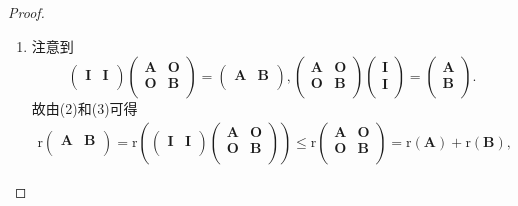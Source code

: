 \documentclass[../../main.tex]{subfiles}%
\begin{document}
\begin{proof}
\begin{enumerate}[(1)]
\item  注意到
\[
\left( \begin{matrix}
\boldsymbol{I}&		\boldsymbol{I}\\
\end{matrix} \right) \left( \begin{matrix}
\boldsymbol{A}&		\boldsymbol{O}\\
\boldsymbol{O}&		\boldsymbol{B}\\
\end{matrix} \right) =\left( \begin{matrix}
\boldsymbol{A}&		\boldsymbol{B}\\
\end{matrix} \right) ,\left( \begin{matrix}
\boldsymbol{A}&		\boldsymbol{O}\\
\boldsymbol{O}&		\boldsymbol{B}\\
\end{matrix} \right) \left( \begin{array}{c}
\boldsymbol{I}\\
\boldsymbol{I}\\
\end{array} \right) =\left( \begin{array}{c}
\boldsymbol{A}\\
\boldsymbol{B}\\
\end{array} \right) .
\]
故由(2)和(3)可得
\begin{align*}
\mathrm{r}\left( \begin{matrix}
\boldsymbol{A}&		\boldsymbol{B}\\
\end{matrix} \right) =\mathrm{r}\left( \left( \begin{matrix}
\boldsymbol{I}&		\boldsymbol{I}\\
\end{matrix} \right) \left( \begin{matrix}
\boldsymbol{A}&		\boldsymbol{O}\\
\boldsymbol{O}&		\boldsymbol{B}\\
\end{matrix} \right) \right) \leqslant \mathrm{r}\left( \begin{matrix}
\boldsymbol{A}&		\boldsymbol{O}\\
\boldsymbol{O}&		\boldsymbol{B}\\
\end{matrix} \right) =\mathrm{r}\left( \boldsymbol{A} \right) +\mathrm{r}\left( \boldsymbol{B} \right) ,

\end{align*}
\end{enumerate}
\end{proof}
\end{document}

